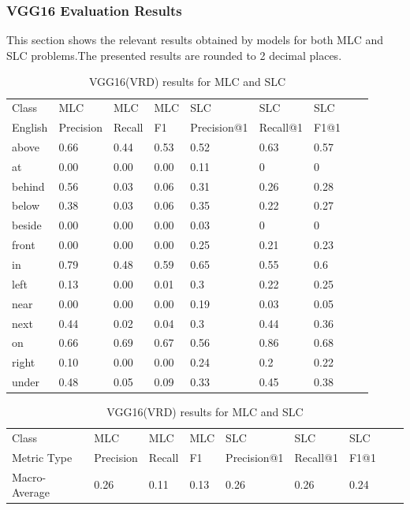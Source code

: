 \documentclass{csfyp}
\begin{document}
\subsubsection{VGG16 Evaluation Results}
This section shows the relevant results obtained by models for both MLC and SLC problems.The presented results are rounded to 2 decimal places.
\newpage
\begin{table}[!htbp]
\centering
\begin{tabular}{|l|l|l|l|l|l|l|l|l}
\cline{1-7}
Class   &  MLC  &  MLC  &  MLC & SLC &  SLC & SLC \\ \cline{1-7}
English & Precision &  Recall   & F1 & Precision@1 & Recall@1 & F1@1 \\ \cline{1-7}
above	&	0.66	&	0.44	&	0.53	&	0.52	&	0.63	&	0.57 \\ \cline{1-7}
at	    &	0.00	&	0.00	&	0.00	&	0.11	&	0	&	0 \\ \cline{1-7} 
behind	&	0.56	&	0.03	&	0.06	&	0.31	&	0.26	&	0.28 \\ \cline{1-7}
below	&	0.38	&	0.03	&	0.06	&	0.35	&	0.22	&	0.27 \\ \cline{1-7} 
beside	&	0.00	&	0.00	&	0.00	&	0.03	&	0	    &	0 \\ \cline{1-7} 
front	&	0.00	&	0.00	&	0.00	&	0.25	&	0.21	&	0.23 \\ \cline{1-7} 
in	    &	0.79	&	0.48	&	0.59	&	0.65	&	0.55	&	0.6 \\ \cline{1-7} 
left	&	0.13	&	0.00	&	0.01	&	0.3	    &	0.22	&	0.25 \\ \cline{1-7} 
near	&	0.00	&	0.00	&	0.00	&	0.19	&	0.03	&	0.05 \\ \cline{1-7} 
next	&	0.44	&	0.02	&	0.04	&	0.3	    &	0.44	&	0.36 \\ \cline{1-7} 
on	    &	0.66	&	0.69	&	0.67	&	0.56	&	0.86	&	0.68 \\ \cline{1-7} 
right	&	0.10	&	0.00	&	0.00	&	0.24	&	0.2	    &	0.22 \\ \cline{1-7} 
under	&	0.48	&	0.05	&	0.09	&	0.33	&	0.45	&	0.38 \\ \cline{1-7}
\end{tabular}
\caption{VGG16(VRD) results for MLC and SLC}
\centering
\begin{tabular}{|l|l|l|l|l|l|l|l|l}
\cline{1-7}
Class &  MLC  &  MLC  &  MLC & SLC &  SLC & SLC \\ \cline{1-7}
Metric Type  & Precision &  Recall & F1 & Precision@1 & Recall@1 & F1@1 \\ \cline{1-7}
Macro-Average &	0.26	&	0.11	&	0.13	&	0.26	&	0.26	&	0.24 \\ \cline{1-7}

\end{tabular}
\end{table}
\end{document}
